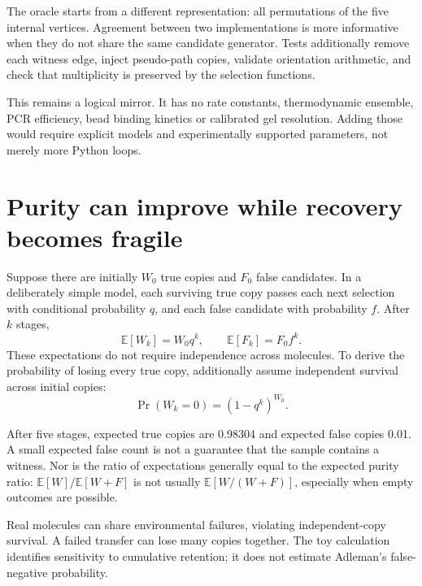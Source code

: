 The oracle starts from a different representation: all permutations of the five internal vertices. Agreement between two implementations is more informative when they do not share the same candidate generator. Tests additionally remove each witness edge, inject pseudo-path copies, validate orientation arithmetic, and check that multiplicity is preserved by the selection functions.

This remains a logical mirror. It has no rate constants, thermodynamic ensemble, PCR efficiency, bead binding kinetics or calibrated gel resolution. Adding those would require explicit models and experimentally supported parameters, not merely more Python loops.

\section{Purity can improve while recovery becomes fragile}
Suppose there are initially $W_0$ true copies and $F_0$ false candidates. In a deliberately simple model, each surviving true copy passes each next selection with conditional probability $q$, and each false candidate with probability $f$. After $k$ stages,
\[
\mathbb E[W_k]=W_0q^k,\qquad
\mathbb E[F_k]=F_0f^k.
\]
These expectations do not require independence across molecules. To derive the probability of losing every true copy, additionally assume independent survival across initial copies:
\begin{equation}
\Pr(W_k=0)=(1-q^k)^{W_0}.
\label{eq:d2loss}
\end{equation}


After five stages, expected true copies are 0.98304 and expected false copies 0.01. A small expected false count is not a guarantee that the sample contains a witness. Nor is the ratio of expectations generally equal to the expected purity ratio: $\mathbb E[W]/\mathbb E[W+F]$ is not usually $\mathbb E[W/(W+F)]$, especially when empty outcomes are possible.

Real molecules can share environmental failures, violating independent-copy survival. A failed transfer can lose many copies together. The toy calculation identifies sensitivity to cumulative retention; it does not estimate Adleman's false-negative probability.

